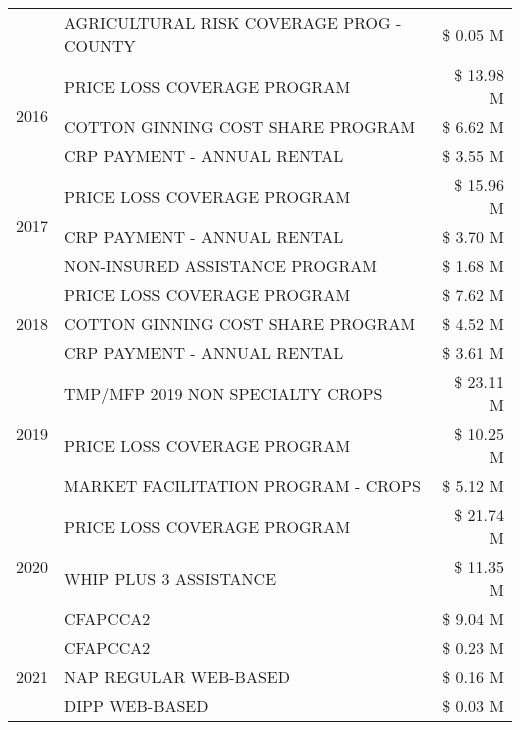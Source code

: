 \begin{tabular}{llr}
 & AGRICULTURAL RISK COVERAGE PROG - COUNTY & \$ 0.05 M \\
\cline{1-3}
\multirow[t]{3}{*}{2016} & PRICE LOSS COVERAGE PROGRAM & \$ 13.98 M \\
 & COTTON GINNING COST SHARE PROGRAM & \$ 6.62 M \\
 & CRP PAYMENT - ANNUAL RENTAL & \$ 3.55 M \\
\cline{1-3}
\multirow[t]{3}{*}{2017} & PRICE LOSS COVERAGE PROGRAM & \$ 15.96 M \\
 & CRP PAYMENT - ANNUAL RENTAL & \$ 3.70 M \\
 & NON-INSURED ASSISTANCE PROGRAM & \$ 1.68 M \\
\cline{1-3}
\multirow[t]{3}{*}{2018} & PRICE LOSS COVERAGE PROGRAM & \$ 7.62 M \\
 & COTTON GINNING COST SHARE PROGRAM & \$ 4.52 M \\
 & CRP PAYMENT - ANNUAL RENTAL & \$ 3.61 M \\
\cline{1-3}
\multirow[t]{3}{*}{2019} & TMP/MFP 2019 NON SPECIALTY CROPS & \$ 23.11 M \\
 & PRICE LOSS COVERAGE PROGRAM & \$ 10.25 M \\
 & MARKET FACILITATION PROGRAM - CROPS & \$ 5.12 M \\
\cline{1-3}
\multirow[t]{3}{*}{2020} & PRICE LOSS COVERAGE PROGRAM & \$ 21.74 M \\
 & WHIP PLUS 3 ASSISTANCE & \$ 11.35 M \\
 & CFAPCCA2 & \$ 9.04 M \\
\cline{1-3}
\multirow[t]{3}{*}{2021} & CFAPCCA2 & \$ 0.23 M \\
 & NAP REGULAR WEB-BASED & \$ 0.16 M \\
 & DIPP WEB-BASED & \$ 0.03 M \\
\cline{1-3}
\bottomrule
\end{tabular}
